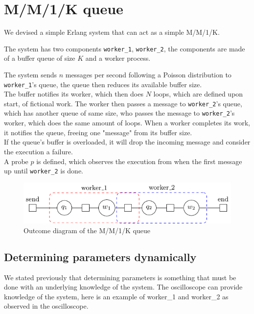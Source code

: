 \section{M/M/1/K queue}
    We devised a simple Erlang system that can act as a simple M/M/1/K.

    The system has two components \texttt{worker\_1}, \texttt{worker\_2}, the components are made of a buffer queue of size $K$ and a worker process.
    
    The system sends $n$ messages per second following a Poisson distribution to \texttt{worker\_1}'s queue, the queue then reduces its available buffer size. \\
    
    The buffer notifies its worker, which then does $N$ loops, which are defined upon start, of fictional work. The worker then passes a message to \texttt{worker\_2}'s queue, which has another queue of same size, who passes the message to \texttt{worker\_2}'s worker, which does the same amount of loops. When a worker completes its work, it notifies the queue, freeing one "message" from its buffer size. \\
    
    If the queue's buffer is overloaded, it will drop the incoming message and consider the execution a failure. \\
    
    A probe $p$ is defined, which observes the execution from when the first message up until \texttt{worker\_2} is done.
    \begin{figure}[H]
        \begin{center}
            \includegraphics[scale=1.2, width=\textwidth]{tikz/mm1k.pdf} 
        \end{center}
        \caption{Outcome diagram of the M/M/1/K queue}
    \end{figure}

    \subsection{Determining parameters dynamically}
        We stated previously that determining parameters is something that must be done with an underlying knowledge of the system. The oscilloscope can provide knowledge of the system, here is an example of worker\_1 and worker\_2 as observed in the oscilloscope.

